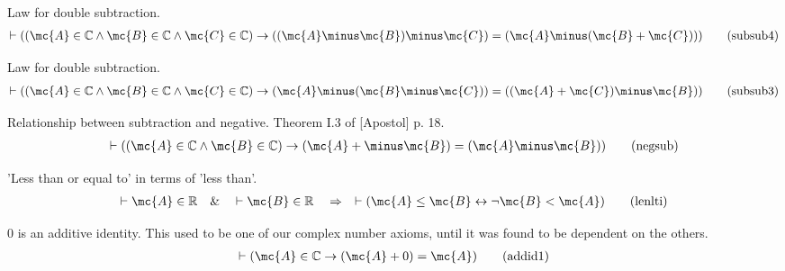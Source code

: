 \begin{lemma} Law for double subtraction. 
\begin{align}
\vdash ( ( \mc{A} \in \mathbb{C} \wedge \mc{B} \in \mathbb{C} \wedge \mc{C} \in
    \mathbb{C} ) \rightarrow ( ( \mc{A} \minus \mc{B} ) \minus \mc{C} ) = ( \mc{A} \minus (
    \mc{B} + \mc{C} ) ) )\label{eq:subsub4}\tag{subsub4}
\end{align}
\end{lemma}


\begin{lemma} Law for double subtraction.  
\begin{align}
\vdash ( ( \mc{A} \in \mathbb{C} \wedge \mc{B} \in \mathbb{C} \wedge \mc{C} \in
    \mathbb{C} ) \rightarrow ( \mc{A} \minus ( \mc{B} \minus \mc{C} ) ) = ( ( \mc{A} +
    \mc{C} ) \minus \mc{B} ) )\label{eq:subsub3}\tag{subsub3}
\end{align}
\end{lemma}


\begin{lemma} Relationship between subtraction and
negative.  Theorem I.3 of [Apostol]  p. 18.  
\begin{align}
\vdash ( ( \mc{A} \in \mathbb{C} \wedge \mc{B} \in \mathbb{C} ) \rightarrow (
    \mc{A} + \minus\mc{B} ) = ( \mc{A} \minus \mc{B} )
    )\label{eq:negsub}\tag{negsub}
\end{align}
\end{lemma}


\begin{lemma} 'Less than or equal to' in terms of 'less
than'.  
\begin{align}
\vdash \mc{A} \in \mathbb{R}\quad\&\quad \vdash \mc{B} \in
    \mathbb{R}\quad\Rightarrow\quad \vdash ( \mc{A} \le \mc{B} \leftrightarrow
    \lnot \mc{B} < \mc{A} )\label{eq:lenlti}\tag{lenlti}
\end{align}
\end{lemma}


\begin{lemma} $0$ is an additive identity.  This used to
be one of our complex
       number axioms, until it was found to be dependent on the others.  
\begin{align}
\vdash ( \mc{A} \in \mathbb{C} \rightarrow ( \mc{A} + 0 ) = \mc{A}
    )\label{eq:addid1}\tag{addid1}
\end{align}
\end{lemma}


